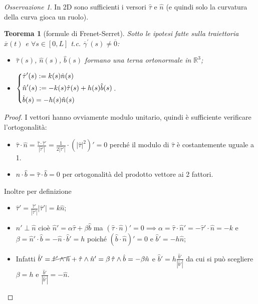 \documentclass{book}
\theoremstyle{plain}
\newtheorem{teo}{Teorema}[chapter]
\theoremstyle{plain}
\theoremstyle{plain}
\theoremstyle{plain}
\theoremstyle{plain}
\theoremstyle{definition}
\theoremstyle{remark}
\newtheorem*{oss}{Osservazione}
\theoremstyle{definition}
\begin{document}
\begin{oss}
    In 2D sono sufficienti i versori $\hat{\tau}$ e $\hat{n}$ (e quindi solo la curvatura della curva gioca un ruolo).
\end{oss}

\begin{teo}[formule di Frenet-Serret]
    Sotto le ipotesi fatte sulla traiettoria $\overline{x}(t)$ e $\forall s \in [0, L]$ t.c. $\overline{\gamma}^{\prime}(s) \neq \overline{0}$:
    \begin{itemize}
        \item $\hat{\tau}(s)$, $\hat{n}(s)$, $\hat{b}(s)$ formano una terna ortonormale in $\mathbb{R}^{3}$;
        \item
        $\begin{dcases}
        \hat{\tau}^{\prime}(s):=k(s)\hat{n}(s)\\\hat{n}^{\prime}(s):= - k(s)\hat{\tau}(s) + h(s)\hat{b}(s)\\\hat{b}(s) = - h(s)\hat{n}(s)
        \end{dcases}$.
    \end{itemize}
\end{teo}

\begin{proof}
    I vettori hanno ovviamente modulo unitario, quindi è sufficiente verificare l'ortogonalità:
    \begin{itemize}
        \item $\hat{\tau}\cdot\hat{n}=\frac{\hat{\tau}\cdot\hat{\tau}'}{|\hat{\tau}'|}=\frac{1}{2|\hat{\tau}'|}\cdot(|\hat{\tau}|^2)'=0$ perché il modulo di $\hat{\tau}$ è costantemente uguale a 1.
        \item $\hat{n}\cdot\hat{b}=\hat{\tau}\cdot\hat{b}=0$ per ortogonalità del prodotto vettore ai 2 fattori.
    \end{itemize}
    Inoltre per definizione
    \begin{itemize}
        \item $\hat{\tau}'=\frac{\hat{\tau}'}{|\hat{\tau}'|}|\hat{\tau}'|=k\hat{n}$;
        \item $\hat{n}'\perp\hat{n}$ cioè $\hat{n}'=\alpha\hat{\tau}+\beta\hat{b}$ ma $(\hat{\tau}\cdot\hat{n})'=0 \implies \alpha =\hat{\tau}\cdot\hat{n}'=-\hat{\tau}'\cdot\hat{n}=-k$ e $\beta=\hat{n}'\cdot\hat{b}=-\hat{n}\cdot\hat{b}'=h$ poiché $(\hat{b}\cdot\hat{n})'=0$ e $\hat{b}'=-h\hat{n}$;
        \item Infatti $\hat{b}'=\cancel{\hat{\tau}'\wedge\hat{n}}+\hat{\tau}\wedge\hat{n}'=\beta\,\hat{\tau}\wedge\hat{b}=-\beta\hat{n}$ e $\hat{b}'=h\frac{\hat{b}'}{|\hat{b}'|}$ da cui si può scegliere $\beta=h$ e $\frac{\hat{b}'}{|\hat{b}'|}=-\hat{n}$.
    \end{itemize}
\end{proof}
\end{document}

